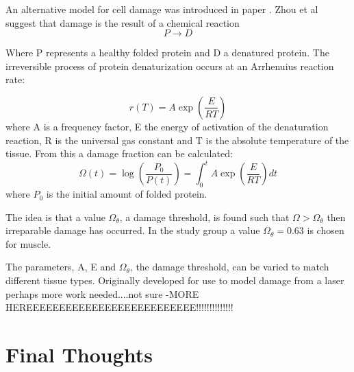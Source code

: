 \documentclass[11pt]{article} %
\begin{document}
		An alternative model for cell damage was introduced in  paper  \cite{Zhou2007}. Zhou et al suggest that damage is the result of a chemical reaction 
		\begin{equation}
		P\rightarrow D
		\end{equation}
		
		Where P represents a healthy folded protein and D a denatured protein. The irreversible process of protein denaturization occurs at an Arrhenuius reaction rate:
		
		\begin{equation}
			r(T)=A\exp\left( \frac{E}{RT}\right) 
		\end{equation}	
		where A is a frequency factor, E the energy of activation of the denaturation reaction, R is the universal gas constant and T is the absolute temperature of the tissue. From this a damage fraction can be calculated:
		\begin{equation}
			\Omega(t)=\log\left( \frac{P_0}{P(t)}\right) =\int_{0}^{t}A\exp\left( \frac{E}{RT}\right) dt
		\end{equation}
		where $ P_0$ is the initial amount of folded protein.
		
		The idea is that a value $\Omega_\theta$, a damage threshold, is found such that $\Omega>\Omega_\theta$ then irreparable damage has occurred. In the study group a value $\Omega_\theta=0.63$ is chosen for muscle. 
		
		
	 	The parameters, A, E and $\Omega_\theta$, the damage threshold, can be varied to match different tissue types. Originally developed for use to model damage from a laser perhaps more work needed....not sure -MORE HEREEEEEEEEEEEEEEEEEEEEEEEEEE!!!!!!!!!!!!!!
	 	
	 	  
	\section{Final Thoughts} 

	
	
	
\end{document}

